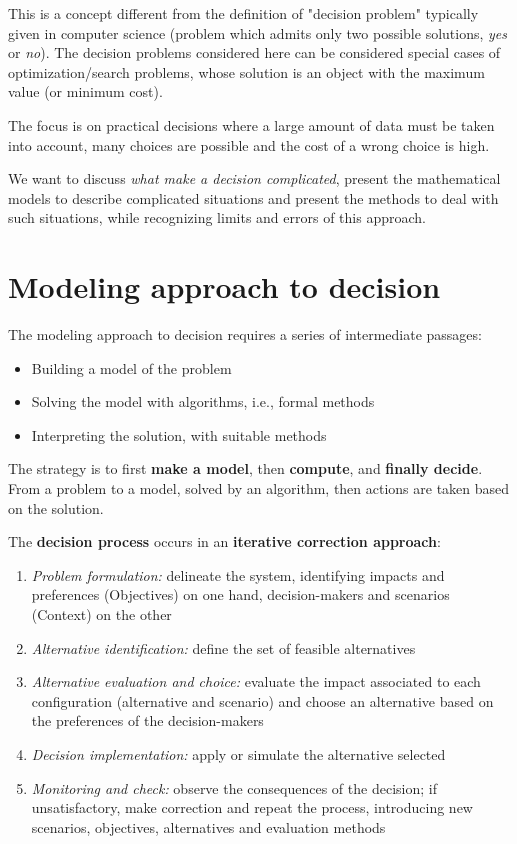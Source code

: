 This is a concept different from the definition of "decision problem" typically given in computer science (problem which admits only two possible solutions, \textit{yes} or \textit{no}). The decision problems considered here can be considered special cases of optimization/search problems, whose solution is an object with the maximum value (or minimum cost). 

The focus is on practical decisions where a large amount of data must be taken into account, many choices are possible and the cost of a wrong choice is high.

We want to discuss \textit{what make a decision complicated}, present the mathematical models to describe complicated situations and present the methods to deal with such situations, while recognizing limits and errors of this approach.

\section{Modeling approach to decision}

The modeling approach to decision requires a series of intermediate passages: 
\begin{itemize}
	\item Building a model of the problem
	
	\item Solving the model with algorithms, i.e., formal methods
	
	\item Interpreting the solution, with suitable methods
\end{itemize}

The strategy is to first \textbf{make a model}, then \textbf{compute}, and \textbf{finally decide}. From a problem to a model, solved by an algorithm, then actions are taken based on the solution.

The \textbf{decision process} occurs in an \textbf{iterative correction approach}:
\begin{enumerate}
	\item \textit{Problem formulation:} delineate the system, identifying impacts and preferences (Objectives) on one hand, decision-makers and scenarios (Context) on the other
	
	\item \textit{Alternative identification:} define the set of feasible alternatives
	
	\item \textit{Alternative evaluation and choice:} evaluate the impact associated to each configuration (alternative and scenario) and choose an alternative based on the preferences of the decision-makers
	
	\item \textit{Decision implementation:} apply or simulate the alternative selected
	
	\item \textit{Monitoring and check:} observe the consequences of the decision; if unsatisfactory, make correction and repeat the process, introducing new scenarios, objectives, alternatives and evaluation methods
\end{enumerate}


